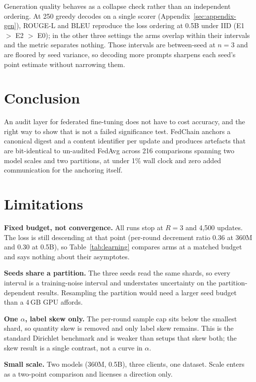 \documentclass[11pt]{article}
\begin{document}
Generation quality behaves as a collapse check rather than an independent ordering. At 250 greedy decodes on a single scorer (Appendix~\ref{sec:appendix-gen}), ROUGE-L and BLEU reproduce the loss ordering at 0.5B under IID (E1 $>$ E2 $>$ E0); in the other three settings the arms overlap within their intervals and the metric separates nothing. Those intervals are between-seed at $n{=}3$ and are floored by seed variance, so decoding more prompts sharpens each seed's point estimate without narrowing them.

\section{Conclusion}

An audit layer for federated fine-tuning does not have to cost accuracy, and the right way to show that is not a failed significance test. FedChain anchors a canonical digest and a content identifier per update and produces artefacts that are bit-identical to un-audited FedAvg across 216 comparisons spanning two model scales and two partitions, at under 1\% wall clock and zero added communication for the anchoring itself.

\section*{Limitations}

\textbf{Fixed budget, not convergence.} All runs stop at $R{=}3$ and 4,500 updates. The loss is still descending at that point (per-round decrement ratio 0.36 at 360M and 0.30 at 0.5B), so Table~\ref{tab:learning} compares arms at a matched budget and says nothing about their asymptotes.

\textbf{Seeds share a partition.} The three seeds read the same shards, so every interval is a training-noise interval and understates uncertainty on the partition-dependent results. Resampling the partition would need a larger seed budget than a 4\,GB GPU affords.

\textbf{One $\alpha$, label skew only.} The per-round sample cap sits below the smallest shard, so quantity skew is removed and only label skew remains. This is the standard Dirichlet benchmark and is weaker than setups that skew both; the skew result is a single contrast, not a curve in $\alpha$.

\textbf{Small scale.} Two models (360M, 0.5B), three clients, one dataset. Scale enters as a two-point comparison and licenses a direction only.
\end{document}
